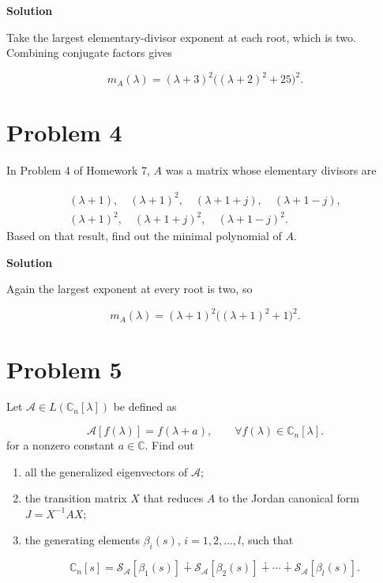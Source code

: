 \documentclass[UTF8,10pt,letterpaper,fontset=fandol]{ctexart}
\newcommand{\C}{\mathbb C}
\begin{document}
\par{}\textbf{Solution}\par
Take the largest elementary-divisor exponent at each root, which is two. Combining conjugate factors gives

\[
\boxed{m_A(\lambda)=(\lambda+3)^2\bigl((\lambda+2)^2+25\bigr)^2}.
\]

\newpage

\section{Problem 4}
In Problem 4 of Homework 7, $A$ was a matrix whose elementary divisors are

\[
\begin{gathered}
(\lambda+1),\quad(\lambda+1)^2,\quad(\lambda+1+j),\quad(\lambda+1-j),\\
(\lambda+1)^2,\quad(\lambda+1+j)^2,\quad(\lambda+1-j)^2.
\end{gathered}
\]
Based on that result, find out the minimal polynomial of $A$.

\par{}\textbf{Solution}\par
Again the largest exponent at every root is two, so

\[
\boxed{m_A(\lambda)=(\lambda+1)^2\bigl((\lambda+1)^2+1\bigr)^2}.
\]

\section{Problem 5}
Let $\mathcal A\in L(\C_n[\lambda])$ be defined as

\[
\mathcal A[f(\lambda)]=f(\lambda+a),\qquad\forall f(\lambda)\in\C_n[\lambda].
\]
for a nonzero constant $a\in\C$. Find out

\begin{enumerate}
\item all the generalized eigenvectors of $\mathcal A$;

\item the transition matrix $X$ that reduces $A$ to the Jordan canonical form $J=X^{-1}AX$;

\item the generating elements $\beta_i(s)$, $i=1,2,\ldots,l$, such that

\[
\C_n[s]=\mathcal S_{\mathcal A}[\beta_1(s)]\dotplus\mathcal S_{\mathcal A}[\beta_2(s)]\dotplus\cdots\dotplus\mathcal S_{\mathcal A}[\beta_l(s)].
\]

\end{enumerate}
\end{document}
